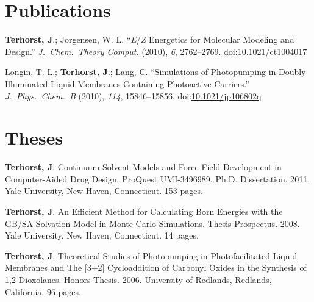 \documentclass[11pt]{article}
\newcommand{\doilink}[1]{\href{http://dx.doi.org/#1}{#1}}
\newcommand{\doi}[1]{doi:\doilink{#1}}
\newcommand{\pubitem}[7]{{#1} {``#2''} \textit{#3} (#4), \textit{#5}, #6. \doi{#7}}
\newcommand{\thesis}[7]{#1 #2 #3. #4. #5, #6. {#7 pages.}}
\begin{document}
\section{Publications}


\pubitem{\textbf{Terhorst, J}.; Jorgensen, W. L.}
{\textit{E}/\textit{Z} Energetics for Molecular Modeling and Design.}
{J.\ Chem.\ Theory Comput.}
{2010}{6}%
{2762--2769}{10.1021/ct1004017}

\pubitem{Longin, T. L.; \textbf{Terhorst, J}.; Lang, C.}
{Simulations of Photopumping in Doubly Illuminated Liquid Membranes Containing Photoactive Carriers.}
{J.\ Phys.\ Chem.\ B}
{2010}{114}%
{15846--15856}{10.1021/jp106802q}


\section{Theses}


\thesis{\textbf{Terhorst, J}.}
{Continuum Solvent Models and Force Field Development in Computer-Aided Drug Design. ProQuest UMI-3496989.}
{Ph.D. Dissertation}{2011}{Yale University}{New Haven, Connecticut}{153} 

\thesis{\textbf{Terhorst, J}.}
{An Efficient Method for Calculating Born Energies with the GB/SA Solvation Model in Monte Carlo Simulations.}
{Thesis Prospectus}{2008}{Yale University}{New Haven, Connecticut}{14}

\thesis{\textbf{Terhorst, J}.}
{Theoretical Studies of Photopumping in Photofacilitated Liquid Membranes and The [3+2] Cycloaddition of Carbonyl Oxides in the Synthesis of 1,2-Dioxolanes.}
{Honors Thesis}{2006}{University of Redlands}{Redlands, California}{96}
\end{document}
